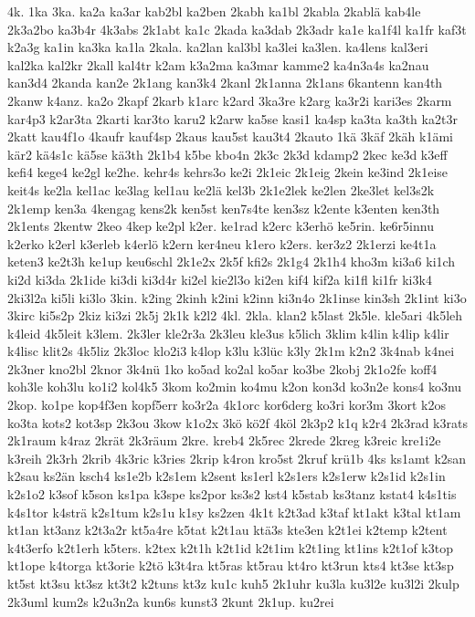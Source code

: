 {4k.
1ka
3ka.
ka2a
ka3ar
kab2bl
ka2ben
2kabh
ka1bl
2kabla
2kablä
kab4le
2k3a2bo
ka3b4r
4k3abs
2k1abt
ka1c
2kada
ka3dab
2k3adr
ka1e
ka1f4l
ka1fr
kaf3t
k2a3g
ka1in
ka3ka
ka1la
2kala.
ka2lan
kal3bl
ka3lei
ka3len.
ka4lens
kal3eri
kal2ka
kal2kr
2kall
kal4tr
k2am
k3a2ma
ka3mar
kamme2
ka4n3a4s
ka2nau
kan3d4
2kanda
kan2e
2k1ang
kan3k4
2kanl
2k1anna
2k1ans
6kantenn
kan4th
2kanw
k4anz.
ka2o
2kapf
2karb
k1arc
k2ard
3ka3re
k2arg
ka3r2i
kari3es
2karm
kar4p3
k2ar3ta
2karti
kar3to
karu2
k2arw
ka5se
kasi1
ka4sp
ka3ta
ka3th
ka2t3r
2katt
kau4f1o
4kaufr
kauf4sp
2kaus
kau5st
kau3t4
2kauto
1kä
3käf
2käh
k1ämi
kär2
kä4s1c
kä5se
kä3th
2k1b4
k5be
kbo4n
2k3c
2k3d
kdamp2
2kec
ke3d
k3eff
kefi4
kege4
ke2gl
ke2he.
kehr4s
kehrs3o
ke2i
2k1eic
2k1eig
2kein
ke3ind
2k1eise
keit4s
ke2la
kel1ac
ke3lag
kel1au
ke2lä
kel3b
2k1e2lek
ke2len
2ke3let
kel3s2k
2k1emp
ken3a
4kengag
kens2k
ken5st
ken7s4te
ken3sz
k2ente
k3enten
ken3th
2k1ents
2kentw
2keo
4kep
ke2pl
k2er.
ke1rad
k2erc
k3erhö
ke5rin.
ke6r5innu
k2erko
k2erl
k3erleb
k4erlö
k2ern
ker4neu
k1ero
k2ers.
ker3z2
2k1erzi
ke4t1a
keten3
ke2t3h
ke1up
keu6schl
2k1e2x
2k5f
kfi2s
2k1g4
2k1h4
kho3m
ki3a6
ki1ch
ki2d
ki3da
2k1ide
ki3di
ki3d4r
ki2el
kie2l3o
ki2en
kif4
kif2a
ki1fl
ki1fr
ki3k4
2ki3l2a
ki5li
ki3lo
3kin.
k2ing
2kinh
k2ini
k2inn
ki3n4o
2k1inse
kin3sh
2k1int
ki3o
3kirc
ki5s2p
2kiz
ki3zi
2k5j
2k1k
k2l2
4kl.
2kla.
klan2
k5last
2k5le.
kle5ari
4k5leh
k4leid
4k5leit
k3lem.
2k3ler
kle2r3a
2k3leu
kle3us
k5lich
3klim
k4lin
k4lip
k4lir
k4lisc
klit2s
4k5liz
2k3loc
klo2i3
k4lop
k3lu
k3lüc
k3ly
2k1m
k2n2
3k4nab
k4nei
2k3ner
kno2bl
2knor
3k4nü
1ko
ko5ad
ko2al
ko5ar
ko3be
2kobj
2k1o2fe
koff4
koh3le
koh3lu
ko1i2
kol4k5
3kom
ko2min
ko4mu
k2on
kon3d
ko3n2e
kons4
ko3nu
2kop.
ko1pe
kop4f3en
kopf5err
ko3r2a
4k1orc
kor6derg
ko3ri
kor3m
3kort
k2os
ko3ta
kots2
kot3sp
2k3ou
3kow
k1o2x
3kö
kö2f
4köl
2k3p2
k1q
k2r4
2k3rad
k3rats
2k1raum
k4raz
2krät
2k3räum
2kre.
kreb4
2k5rec
2krede
2kreg
k3reic
kre1i2e
k3reih
2k3rh
2krib
4k3ric
k3ries
2krip
k4ron
kro5st
2kruf
krü1b
4ks
ks1amt
k2san
k2sau
ks2än
ksch4
ks1e2b
k2s1em
k2sent
ks1erl
k2s1ers
k2s1erw
k2s1id
k2s1in
k2s1o2
k3sof
k5son
ks1pa
k3spe
ks2por
ks3s2
kst4
k5stab
ks3tanz
kstat4
k4s1tis
k4s1tor
k4strä
k2s1tum
k2s1u
k1sy
ks2zen
4k1t
k2t3ad
k3taf
kt1akt
k3tal
kt1am
kt1an
kt3anz
k2t3a2r
kt5a4re
k5tat
k2t1au
ktä3s
kte3en
k2t1ei
k2temp
k2tent
k4t3erfo
k2t1erh
k5ters.
k2tex
k2t1h
k2t1id
k2t1im
k2t1ing
kt1ins
k2t1of
k3top
kt1ope
k4torga
kt3orie
k2tö
k3t4ra
kt5ras
kt5rau
kt4ro
kt3run
kts4
kt3se
kt3sp
kt5st
kt3su
kt3sz
kt3t2
k2tuns
kt3z
ku1c
kuh5
2k1uhr
ku3la
ku3l2e
ku3l2i
2kulp
2k3uml
kum2s
k2u3n2a
kun6s
kunst3
2kunt
2k1up.
ku2rei
}
